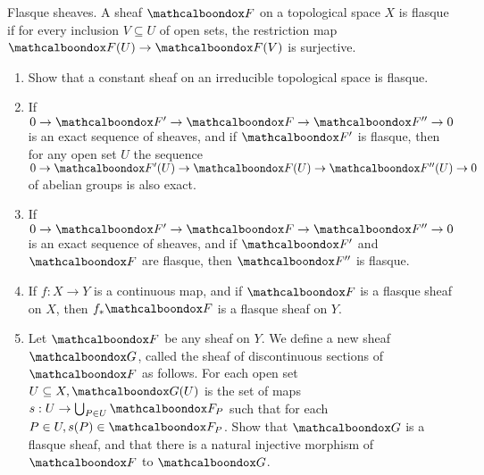 \begin{ex}
	Flasque sheaves. A sheaf $\sF$ on a topological space $X$ is flasque if for every inclusion $V \subseteq U$ of open sets, the restriction map $\sF(U) \to \sF(V)$ is surjective.
	\begin{enumerate}[label=\alph*)]
		\item Show that a constant sheaf on an irreducible topological space is flasque.
		\item If $0 \to \sF' \to \sF \to \sF'' \to 0$ is an exact sequence of sheaves, and if $\sF'$ is flasque, then for any open set $U$ the sequence $0 \to \sF'(U) \to \sF(U) \to \sF''(U) \to 0$ of abelian groups is also exact.
		\item If $0 \to \sF' \to \sF \to \sF'' \to 0$ is an exact sequence of sheaves, and if $\sF'$ and $\sF$ are flasque, then $\sF''$ is flasque.
		\item If $f: X \to Y$ is a continuous map, and if $\sF$ is a flasque sheaf on $X$, then $f_{*}\sF$ is a flasque sheaf on $Y$.
		\item Let $\sF$ be any sheaf on $Y$. We define a new sheaf $\sG$, called the sheaf of discontinuous sections of $\sF$ as follows. For each open set $U \subseteq X, \sG(U)$ is the set of maps $s: U \to \bigcup_{P \in U} \sF_P$ such that for each $P \in U, s(P) \in \sF_P$. Show that $\sG$ is a flasque sheaf, and that there is a natural injective morphism of $\sF$ to $\sG$.
	\end{enumerate}
\end{ex}

